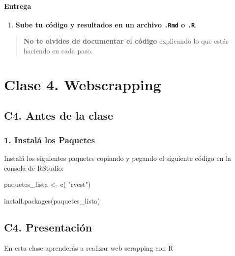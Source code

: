 \documentclass[
  letterpaper,
  DIV=11,
  numbers=noendperiod]{scrreprt}
\newenvironment{Shaded}{\begin{snugshade}}{\end{snugshade}}
\newcommand{\FunctionTok}[1]{\textcolor[rgb]{0.28,0.35,0.67}{#1}}
\newcommand{\NormalTok}[1]{\textcolor[rgb]{0.00,0.23,0.31}{#1}}
\newcommand{\OtherTok}[1]{\textcolor[rgb]{0.00,0.23,0.31}{#1}}
\newcommand{\StringTok}[1]{\textcolor[rgb]{0.13,0.47,0.30}{#1}}
\providecommand{\tightlist}{%
  \setlength{\itemsep}{0pt}\setlength{\parskip}{0pt}}\usepackage{longtable,booktabs,array}
\begin{document}
\subsection{Entrega}\label{entrega}

\begin{enumerate}
\def\labelenumi{\arabic{enumi}.}
\tightlist
\item
  \textbf{Sube tu código y resultados en un archivo \texttt{.Rmd} o
  \texttt{.R}}.
\end{enumerate}

\begin{quote}
\textbf{No te olvides de documentar el código} explicando lo que estás
haciendo en cada paso.
\end{quote}

\part{\textbf{Clase 4. Webscrapping}}

\chapter{C4. Antes de la clase}\label{c4.-antes-de-la-clase}

\section{\texorpdfstring{\textbf{1. Instalá los
Paquetes}}{1. Instalá los Paquetes}}\label{instaluxe1-los-paquetes}

Instalá los siguientes paquetes copiando y pegando el siguiente código
en la consola de RStudio:

\begin{Shaded}
\begin{Highlighting}[]

\NormalTok{paquetes\_lista }\OtherTok{\textless{}{-}} \FunctionTok{c}\NormalTok{(}
  \StringTok{"rvest"}\NormalTok{)}

\FunctionTok{install.packages}\NormalTok{(paquetes\_lista)}
\end{Highlighting}
\end{Shaded}

\chapter{C4. Presentación}\label{c4.-presentaciuxf3n}

En esta clase aprenderás a realizar web scrapping con R
\end{document}
